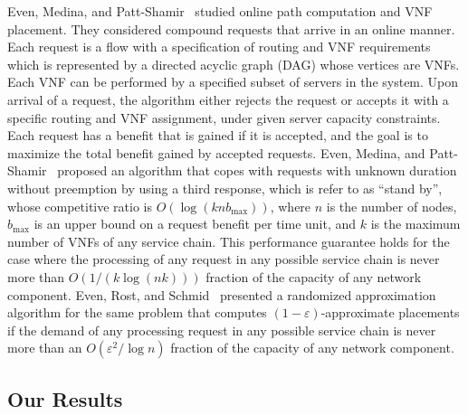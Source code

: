 \documentclass[runningheads]{llncs}
\newcommand{\eps}{\varepsilon}
\begin{document}
Even, Medina, and Patt-Shamir~\cite{EMP16} studied online path
computation and VNF placement.  They considered compound requests that
arrive in an online manner.  Each request is a flow with a
specification of routing and VNF requirements which is represented by
a directed acyclic graph (DAG) whose vertices are VNFs.  Each VNF can
be performed by a specified subset of servers in the system.  Upon
arrival of a request, the algorithm either rejects the request or
accepts it with a specific routing and VNF assignment, under given
server capacity constraints.  Each request has a benefit that is
gained if it is accepted, and the goal is to maximize the total
benefit gained by accepted requests.
%
Even, Medina, and Patt-Shamir~\cite{EMP16} proposed an algorithm that
copes with requests with unknown duration without preemption by using
a third response, which is refer to as “stand by”, whose competitive
ratio is $O(\log (knb_{\max}))$, where $n$ is the number of nodes,
$b_{\max}$ is an upper bound on a request benefit per time unit, and
$k$ is the maximum number of VNFs of any service chain.  This
performance guarantee holds for the case where the processing of any
request in any possible service chain is never more than
$O(1/(k \log (nk)))$ fraction of the capacity of any network
component.
%
Even, Rost, and Schmid~\cite{ERS16} presented a randomized
approximation algorithm for the same problem that computes
$(1-\eps)$-approximate placements if the demand of any processing
request in any possible service chain is never more than an
$O(\eps^2/\log n)$ fraction of the capacity of any network component.


\subsection{Our Results}
\end{document}
